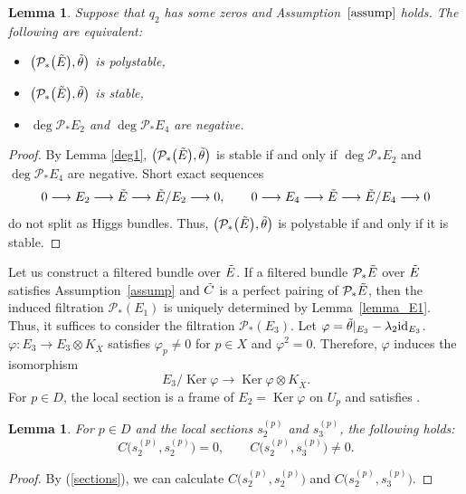 \documentclass[10pt,a4paper]{amsart}
\numberwithin{equation}{section}
\newtheorem{Lemma}[Theorem]{Lemma}
\newcommand{\id}{\mathrm{id}}
\newcommand{\Ker}{\operatorname{Ker}}
\begin{document}
\begin{Lemma}\label{polystable}
 Suppose that $q_2$ has some zeros and Assumption~$\ref{assump}$ holds. The following are equivalent:
 \begin{itemize}\itemsep=0pt
 \item $\bigl(\mathcal{P}_*\bigl(\Tilde{E}\bigr),\Tilde{\theta}\bigr)$ is polystable,
 \item $\bigl(\mathcal{P}_*\bigl(\Tilde{E}\bigr),\Tilde{\theta}\bigr)$ is stable,
 \item $\deg{\mathcal{P}_{*}E_2}$ and $\deg{\mathcal{P}_{*}E_4}$ are negative.
 \end{itemize}
\end{Lemma}
\begin{proof}
 By Lemma \ref{deg1}, $\bigl(\mathcal{P}_*\bigl(\Tilde{E}\bigr),\Tilde{\theta}\bigr)$ is stable if and only if $\deg{\mathcal{P}_{*}E_2}$ and $\deg{\mathcal{P}_{*}E_4}$ are negative.
 Short exact sequences
 \begin{align*}
 0\longrightarrow E_2\longrightarrow \Tilde{E} \longrightarrow \Tilde{E}/E_2\longrightarrow 0,\qquad
 0\longrightarrow E_4\longrightarrow \Tilde{E} \longrightarrow \Tilde{E}/E_4\longrightarrow 0
 \end{align*}
 do not split as Higgs bundles. Thus, $\bigl(\mathcal{P}_*\bigl(\Tilde{E}\bigr),\Tilde{\theta}\bigr)$ is polystable if and only if it is stable.
\end{proof}

Let us construct a filtered bundle over $\Tilde{E}$. If a filtered bundle $\mathcal{P}_{*}\Tilde{E}$ over $\Tilde{E}$ satisfies Assumption~\ref{assump} and $\Tilde{C}$ is a perfect pairing of $\mathcal{P}_{*}\Tilde{E}$, then the induced filtration $\mathcal{P}_*(E_1)$ is uniquely determined by Lemma~\ref{lemma_E1}. Thus, it suffices to consider the filtration $\mathcal{P}_*(E_3)$.
Let $\varphi = \Tilde{\theta}|_{E_3}-\lambda_2 \id_{E_3}$. $\varphi\colon E_3\to E_3 \otimes K_{\overline{X}}$ satisfies $\varphi_p\neq 0$ for $p\in X$ and $\varphi^2=0$. Therefore, $\varphi$ induces the isomorphism%
\begin{equation}\label{isomorphism}
 E_3/\Ker{\varphi} \longrightarrow \Ker{\varphi}\otimes K_{\overline{X}}.
\end{equation}
For $p\in D$, the local section  is a frame of $E_2=\Ker{\varphi}$ on $U_p$ and  satisfies .
\begin{Lemma}\label{section_C}
 For $p\in D$ and the local sections $s^{(p)}_2$ and $s^{(p)}_3$, the following holds:
 \begin{equation*}
 C\bigl(s^{(p)}_2,s^{(p)}_2\bigr) = 0,\qquad C\bigl(s^{(p)}_2,s^{(p)}_3\bigr) \neq 0.
 \end{equation*}
\end{Lemma}
\begin{proof}
 By (\ref{sections}), we can calculate $C\bigl(s^{(p)}_2,s^{(p)}_2\bigr)$ and $C\bigl(s^{(p)}_2,s^{(p)}_3\bigr)$.
\end{proof}
\end{document}
